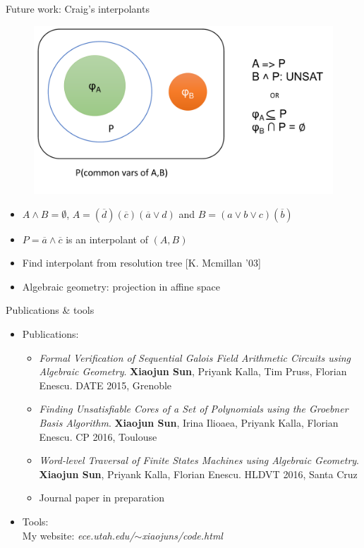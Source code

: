 \documentclass[xcolor=dvipsnames]{beamer}
\newcommand{\bi}{\begin{itemize}}
\newcommand{\ei}{\end{itemize}}
\begin{document}
\begin{frame}{\large{Future work: Craig's interpolants}}
\begin{figure}
\centering
\includegraphics[scale=0.3]{venn_craig.pdf}
\end{figure}
\vspace{-0.2in}
\bi
\item $ A \wedge B = \emptyset$, $A = (\overline{d})(\overline{c})(\overline{a}\vee
d)$ and  $B = (a \vee b \vee c)(\overline{b})$
\item $P = \overline{a}\wedge \overline{c}$ is an interpolant of $(A, B)$
\item Find interpolant from resolution tree [K. Mcmillan '03]
\item Algebraic geometry: projection in affine space
\ei
\end{frame}
\begin{frame}{\large{Publications \& tools}}
\bi
\item Publications:
	\bi
	\item {\it Formal Verification of Sequential Galois Field Arithmetic Circuits using Algebraic Geometry}. {\bf Xiaojun Sun}, Priyank Kalla, Tim Pruss, Florian Enescu. DATE 2015, Grenoble
	\item {\it Finding Unsatisfiable Cores of a Set of Polynomials using the Groebner Basis Algorithm}. {\bf Xiaojun Sun}, Irina Ilioaea, Priyank Kalla, Florian Enescu. CP 2016, Toulouse
	\item {\it Word-level Traversal of Finite States Machines using Algebraic Geometry}. {\bf Xiaojun Sun}, Priyank Kalla, Florian Enescu. HLDVT 2016, Santa Cruz
	\item Journal paper in preparation
	\ei
\item Tools:\\
My website: {\it ece.utah.edu/$\sim$xiaojuns/code.html}
\ei
\end{frame}
\end{document}
